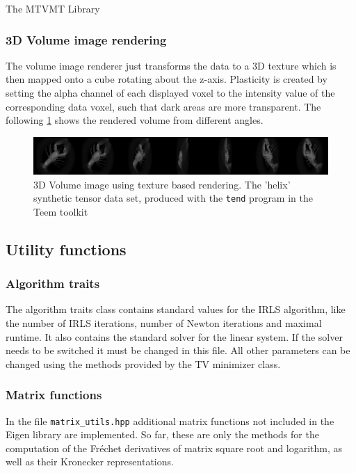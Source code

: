 \begin{chapter}{The MTVMT Library}
\FloatBarrier
\subsubsection{3D Volume image rendering} %
\label{ssub:3D Volume image rendering}
The volume image renderer just transforms the data to a 3D texture which is then mapped onto a cube rotating about the z-axis.
Plasticity is created by setting the alpha channel of each displayed voxel to the intensity value of the corresponding data voxel, such that dark areas are more transparent.
The following \ref{fig:volume_visualization} shows the rendered volume from different angles.
\begin{figure}[h!]
        \centering
	    \includegraphics[width=1.0\linewidth]{./figures/library/3dvol_seq.png}
	    \caption[3D Volume image renderer]{3D Volume image using texture based rendering. The 'helix' synthetic tensor data set, produced with the \texttt{tend} program in the Teem toolkit\cite{teem}}
	\label{fig:volume_visualization}
\end{figure}


\subsection{Utility functions} %
\label{sub:Utility function}

\subsubsection{Algorithm traits} %
\label{ssub:AlgoTraits}
The algorithm traits class contains standard values for the IRLS algorithm, like the number of IRLS iterations, number of Newton iterations and maximal runtime.
It also contains the standard solver for the linear system. If the solver needs to be switched it must be changed in this file. All other parameters can
be changed using the methods provided by the TV minimizer class.


\subsubsection{Matrix functions} %
\label{ssub:Matrix functions}
In the file \texttt{matrix\_utils.hpp} additional matrix functions not included in the Eigen library are implemented.
So far, these are only the methods for the computation of the Fr\'{e}chet derivatives of matrix square root and logarithm, as well as their
Kronecker representations.


\end{chapter}
